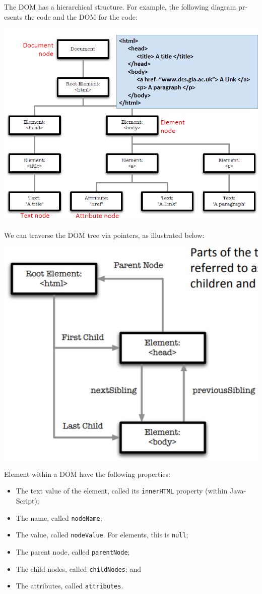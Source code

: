 \documentclass[a4paper, openany]{memoir}
\begin{document}
\noindent The DOM has a hierarchical structure. For example, the following diagram pr-esents the code and the DOM for the code:
\begin{center}
    \includegraphics[scale=0.5]{src/L12I4.PNG}
\end{center}
We can traverse the DOM tree via pointers, as illustrated below:
\begin{center}
    \includegraphics[scale=0.5]{src/L12I2.PNG}
\end{center}
Element within a DOM have the following properties:
\begin{itemize}
    \item The text value of the element, called its \texttt{innerHTML} property (within Java-Script);
    \item The name, called \texttt{nodeName};
    \item The value, called \texttt{nodeValue}. For elements, this is \texttt{null};
    \item The parent node, called \texttt{parentNode};
    \item The child nodes, called \texttt{childNodes}; and
    \item The attributes, called \texttt{attributes}.
\end{itemize}
\end{document}
